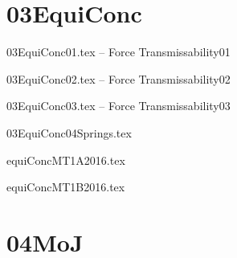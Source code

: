 \documentclass[9pt,xcolor={svgnames, x11names}]{beamer}
\def\scale{1} %
\begin{document}
\section{03EquiConc}
\begin{frame}{03EquiConc01.tex -- Force Transmissability01}
	\def\scale{1}
	\centering
	
\end{frame}
\begin{frame}{03EquiConc02.tex -- Force Transmissability02}
	\def\scale{1}
	\centering
	
\end{frame}
\begin{frame}{03EquiConc03.tex -- Force Transmissability03}
	\def\scale{1}
	\centering
	
\end{frame}
\begin{frame}{03EquiConc04Springs.tex}
	\def\scale{1}
	\centering
	
\end{frame}
\begin{frame}{equiConcMT1A2016.tex}
	\def\scale{0.8}
	\centering
	
\end{frame}
\begin{frame}{equiConcMT1B2016.tex}
	\def\scale{0.8}
	\centering
	
\end{frame}


\section{04MoJ}
% 	
\end{document}
